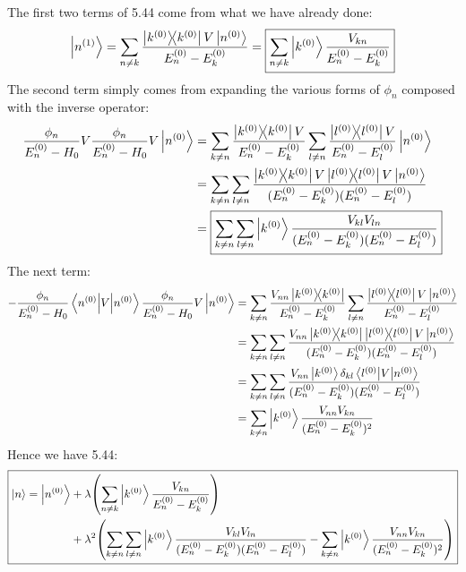 \documentclass[12pt]{article}
\begin{document}
The first two terms of 5.44 come from what we have already done:
\begin{align*}
  \ket{n^{(1)}}=\sum_{n\neq k}
  \frac{\dyad{k^{(0)}}V\ket{n^{(0)}}}{E_n^{(0)}-E_k^{(0)}}=
  \boxed{\sum_{n\neq k}\ket{k^{(0)}}\frac{V_{kn}}{E_n^{(0)}-E_k^{(0)}}}
\end{align*}
The second term simply comes from expanding the various forms of $\phi_n$ composed with the inverse operator:
\begin{align*}
  \frac{\phi_n}{E_n^{(0)}-H_0}V\frac{\phi_n}{E_n^{(0)}-H_0}V\ket{n^{(0)}}
  &=\sum_{k\neq n}\frac{\dyad{k^{(0)}}V}{E_n^{(0)}-E_k^{(0)}}
  \sum_{l\neq n}\frac{\dyad{l^{(0)}}V}{E_n^{(0)}-E_l^{(0)}}\ket{n^{(0)}}\\
  &=\sum_{k\neq n}\sum_{l\neq n}
  \frac{\dyad{k^{(0)}}V\dyad{l^{(0)}}V\ket{n^{(0)}}}
  {(E_n^{(0)}-E_k^{(0)})(E_n^{(0)}-E_l^{(0)})}\\
  &=\boxed{\sum_{k\neq n}\sum_{l\neq n}\ket{k^{(0)}}
  \frac{V_{kl}V_{ln}}{(E_n^{(0)}-E_k^{(0)})(E_n^{(0)}-E_l^{(0)})}}
\end{align*}
The next term:
\begin{align*}
  -\frac{\phi_n}{E_n^{(0)}-H_0}\mel{n^{(0)}}{V}{n^{(0)}}
  \frac{\phi_n}{E_n^{(0)}-H_0}V\ket{n^{(0)}}&=
  \sum_{k\neq n}\frac{V_{nn}\dyad{k^{(0)}}}{E_n^{(0)}-E_k^{(0)}}
  \sum_{l\neq n}\frac{\dyad{l^{(0)}}V\ket{n^{(0)}}}{E_n^{(0)}-E_l^{(0)}}\\
  &=\sum_{k\neq n}\sum_{l\neq n}
  \frac{V_{nn}\dyad{k^{(0)}}\dyad{l^{(0)}}V\ket{n^{(0)}}}
  {(E_n^{(0)}-E_k^{(0)})(E_n^{(0)}-E_l^{(0)})}\\
  &=\sum_{k\neq n}\sum_{l\neq n}
  \frac{V_{nn}\ket{k^{(0)}}\delta_{kl}\mel{l^{(0)}}{V}{n^{(0)}}}
  {(E_n^{(0)}-E_k^{(0)})(E_n^{(0)}-E_l^{(0)})}\\
  &=\sum_{k\neq n}\ket{k^{(0)}}
  \frac{V_{nn}V_{kn}}
  {(E_n^{(0)}-E_k^{(0)})^2}
\end{align*}
Hence we have 5.44:
\begin{equation}
  \boxed{\begin{aligned}
    \ket{n}=\ket{n^{(0)}}&+
    \lambda\qty(\sum_{n\neq k}\ket{k^{(0)}}\frac{V_{kn}}{E_n^{(0)}-E_k^{(0)}})\\
    &+\lambda^2\qty(\sum_{k\neq n}\sum_{l\neq n}\ket{k^{(0)}}
    \frac{V_{kl}V_{ln}}{(E_n^{(0)}-E_k^{(0)})(E_n^{(0)}-E_l^{(0)})}
    -\sum_{k\neq n}\ket{k^{(0)}}\frac{V_{nn}V_{kn}}{(E_n^{(0)}-E_k^{(0)})^2})
  \end{aligned}}
\end{equation}
\end{document}
